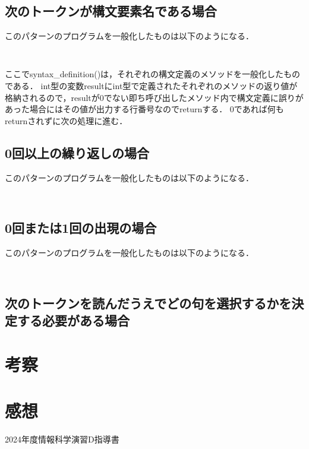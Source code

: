 \documentclass[dvipdfmx]{jarticle}
\begin{document}
\subsection{次のトークンが構文要素名である場合}
このパターンのプログラムを一般化したものは以下のようになる．
\begin{lstlisting}
  
\end{lstlisting}
ここでsyntax\_definition()は，それぞれの構文定義のメソッドを一般化したものである．
int型の変数resultにint型で定義されたそれぞれのメソッドの返り値が格納されるので，resultが0でない即ち呼び出したメソッド内で構文定義に誤りがあった場合にはその値が出力する行番号なのでreturnする．
0であれば何もreturnされずに次の処理に進む．
\subsection{0回以上の繰り返しの場合}
このパターンのプログラムを一般化したものは以下のようになる．
\begin{lstlisting}
  
\end{lstlisting}
\subsection{0回または1回の出現の場合}
このパターンのプログラムを一般化したものは以下のようになる．
\begin{lstlisting}
  
\end{lstlisting}
\subsection{次のトークンを読んだうえでどの句を選択するかを決定する必要がある場合}
\section{考察}
\section{感想}

\begin{thebibliography}{1}
     2024年度情報科学演習D指導書
\end{thebibliography}
\end{document}
